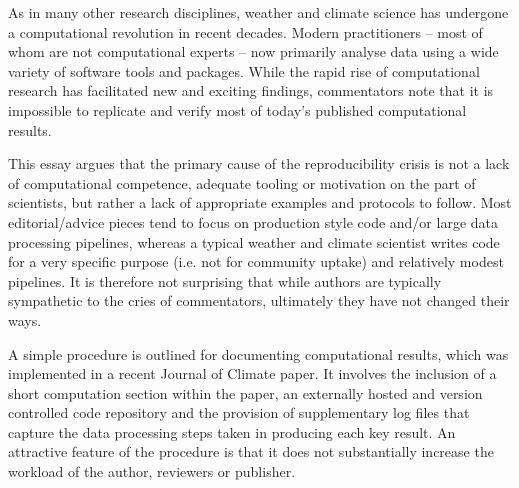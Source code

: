 As in many other research disciplines, weather and climate science has undergone a computational revolution in recent decades. Modern practitioners – most of whom are not computational experts – now primarily analyse data using a wide variety of software tools and packages. While the rapid rise of computational research has facilitated new and exciting findings, commentators note that it is impossible to replicate and verify most of today's published computational results.

This essay argues that the primary cause of the reproducibility crisis is not a lack of computational competence, adequate tooling or motivation on the part of scientists, but rather a lack of appropriate examples and protocols to follow. Most editorial/advice pieces tend to focus on production style code and/or large data processing pipelines, whereas a typical weather and climate scientist writes code for a very specific purpose (i.e. not for community uptake) and relatively modest pipelines. It is therefore not surprising that while authors are typically sympathetic to the cries of commentators, ultimately they have not changed their ways.

A simple procedure is outlined for documenting computational results, which was implemented in a recent Journal of Climate paper. It involves the inclusion of a short computation section within the paper, an externally hosted and version controlled code repository and the provision of supplementary log files that capture the data processing steps taken in producing each key result. An attractive feature of the procedure is that it does not substantially increase the workload of the author, reviewers or publisher.
